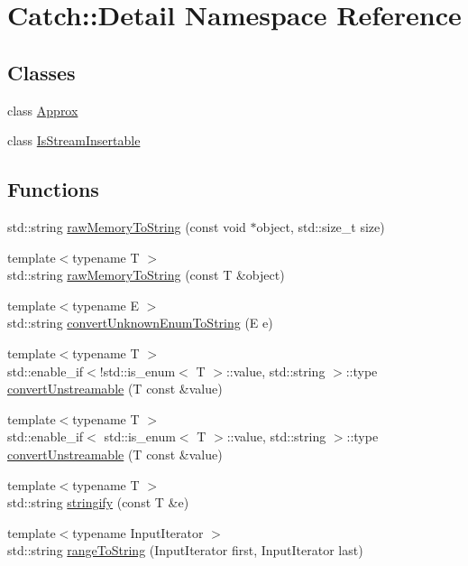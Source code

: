 \hypertarget{namespace_catch_1_1_detail}{}\section{Catch\+:\+:Detail Namespace Reference}
\label{namespace_catch_1_1_detail}
\subsection*{Classes}
\begin{DoxyCompactItemize}
\item 
class \mbox{\hyperlink{class_catch_1_1_detail_1_1_approx}{Approx}}
\item 
class \mbox{\hyperlink{class_catch_1_1_detail_1_1_is_stream_insertable}{Is\+Stream\+Insertable}}
\end{DoxyCompactItemize}
\subsection*{Functions}
\begin{DoxyCompactItemize}
\item 
std\+::string \mbox{\hyperlink{namespace_catch_1_1_detail_ac5d6c510e565ee5bddcc2236194ce29e}{raw\+Memory\+To\+String}} (const void $\ast$object, std\+::size\+\_\+t size)
\item 
{\footnotesize template$<$typename T $>$ }\\std\+::string \mbox{\hyperlink{namespace_catch_1_1_detail_a371620ed524abfcae5c3772bf49b563a}{raw\+Memory\+To\+String}} (const T \&object)
\item 
{\footnotesize template$<$typename E $>$ }\\std\+::string \mbox{\hyperlink{namespace_catch_1_1_detail_a242396de537c5176710d680cc9ca6b93}{convert\+Unknown\+Enum\+To\+String}} (E e)
\item 
{\footnotesize template$<$typename T $>$ }\\std\+::enable\+\_\+if$<$!std\+::is\+\_\+enum$<$ T $>$\+::value, std\+::string $>$\+::type \mbox{\hyperlink{namespace_catch_1_1_detail_accc3d481dbb5356a8c2c04338b511ee1}{convert\+Unstreamable}} (T const \&value)
\item 
{\footnotesize template$<$typename T $>$ }\\std\+::enable\+\_\+if$<$ std\+::is\+\_\+enum$<$ T $>$\+::value, std\+::string $>$\+::type \mbox{\hyperlink{namespace_catch_1_1_detail_abf38276f70bd8b4d9ffe61c6e042304b}{convert\+Unstreamable}} (T const \&value)
\item 
{\footnotesize template$<$typename T $>$ }\\std\+::string \mbox{\hyperlink{namespace_catch_1_1_detail_af0ad48344ffd3f92f3568465248a9880}{stringify}} (const T \&e)
\item 
{\footnotesize template$<$typename Input\+Iterator $>$ }\\std\+::string \mbox{\hyperlink{namespace_catch_1_1_detail_a6650a1dff325bf29962ff15ae73fd972}{range\+To\+String}} (Input\+Iterator first, Input\+Iterator last)
\end{DoxyCompactItemize}
